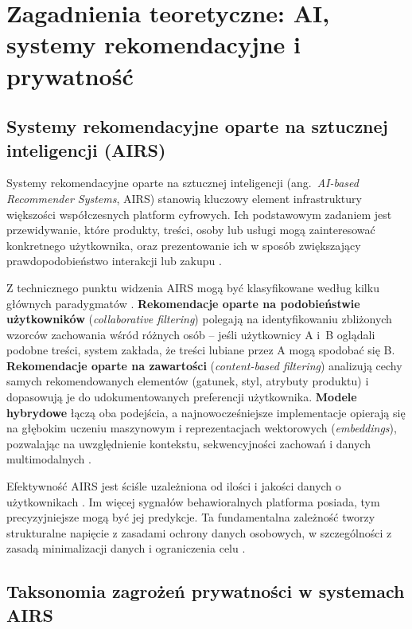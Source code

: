 \documentclass[12pt, a4paper]{article}
\begin{document}
\section{Zagadnienia teoretyczne: AI, systemy rekomendacyjne i prywatność}

\subsection{Systemy rekomendacyjne oparte na sztucznej inteligencji (AIRS)}

Systemy rekomendacyjne oparte na sztucznej inteligencji (ang.\ \textit{AI-based Recommender Systems}, AIRS) stanowią kluczowy element infrastruktury większości współczesnych platform cyfrowych. Ich podstawowym zadaniem jest przewidywanie, które produkty, treści, osoby lub usługi mogą zainteresować konkretnego użytkownika, oraz prezentowanie ich w sposób zwiększający prawdopodobieństwo interakcji lub zakupu \cite{chen2025, himeur2022}.

Z technicznego punktu widzenia AIRS mogą być klasyfikowane według kilku głównych paradygmatów \cite{himeur2022}. \textbf{Rekomendacje oparte na podobieństwie użytkowników} (\textit{collaborative filtering}) polegają na identyfikowaniu zbliżonych wzorców zachowania wśród różnych osób -- jeśli użytkownicy A i~B oglądali podobne treści, system zakłada, że treści lubiane przez A mogą spodobać się B. \textbf{Rekomendacje oparte na zawartości} (\textit{content-based filtering}) analizują cechy samych rekomendowanych elementów (gatunek, styl, atrybuty produktu) i dopasowują je do udokumentowanych preferencji użytkownika. \textbf{Modele hybrydowe} łączą oba podejścia, a najnowocześniejsze implementacje opierają się na głębokim uczeniu maszynowym i reprezentacjach wektorowych (\textit{embeddings}), pozwalając na uwzględnienie kontekstu, sekwencyjności zachowań i danych multimodalnych \cite{himeur2022, netflix_research}.

Efektywność AIRS jest ściśle uzależniona od ilości i jakości danych o użytkownikach \cite{chen2025}. Im więcej sygnałów behawioralnych platforma posiada, tym precyzyjniejsze mogą być jej predykcje. Ta fundamentalna zależność tworzy strukturalne napięcie z zasadami ochrony danych osobowych, w szczególności z zasadą minimalizacji danych i ograniczenia celu \cite{rodo, chen2025}.

\subsection{Taksonomia zagrożeń prywatności w systemach AIRS}
\end{document}
